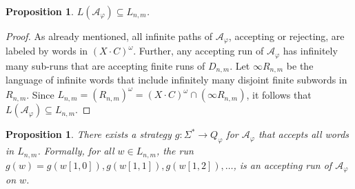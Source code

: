 \documentclass[10pt,a4paper]{amsart}
\newtheorem{prop}[thm]{Proposition}
\theoremstyle{definition}
\numberwithin{equation}{section}
\newcommand{\A}{{\mathcal A}}
\begin{document}
\begin{prop}
	$L(\A_\varphi)\subseteq L_{n,m}$.
\end{prop}
\begin{proof}
	As already mentioned, all infinite paths of $\A_\varphi$, accepting or rejecting, are labeled by words in $(X\cdot C)^\omega$. 
	Further, any accepting run of $\A_\varphi$ has infinitely many sub-runs that are accepting finite runs of $D_{n,m}$. 
		Let $\infty R_{n,m}$ be the language of infinite words that include infinitely many disjoint finite subwords in $R_{n,m}$. 
	Since $L_{n,m}=(R_{n,m})^\omega = (X\cdot C)^\omega\cap (\infty R_{n,m})$, it follows that $L(\A_\varphi)\subseteq L_{n,m}$. 
\end{proof}

\begin{prop}

\label{A phi HD}
	There exists a strategy $g:\Sigma^*\rightarrow Q_{\varphi}$ for $\A_\varphi$ that accepts all words in $L_{n,m}$. Formally, for all $w\in L_{n,m}$, the run $g(w)=g(w[1,0]),g(w[1,1]),g(w[1,2]),\ldots$, is an accepting run of $\A_\varphi$ on $w$.
\end{prop}
\end{document}
